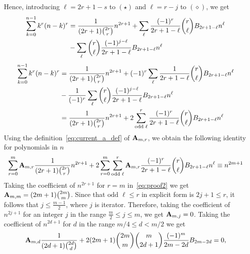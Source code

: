 Hence, introducing $\ell=2r+1-s$ to $(\star)$ and $\ell=r-j$ to $(\diamond)$, we get
\begin{equation*}
    \begin{split}
        \sum_{k=0}^{n-1} k^r (n-k)^r
        &=\frac{1}{(2r+1) \binom{2r}{r}} n^{2r+1}
        +\sum_{\ell} \frac{(-1)^r}{2r+1-\ell} \binom{r}{\ell} {B}\sb{2r+1-\ell} n^{\ell} \\
        &-\sum_{\ell} \binom{r}{\ell} \frac{(-1)^{j-\ell}}{2r+1-\ell} {B}\sb{2r+1-\ell} n^{\ell}
    \end{split}
\end{equation*}
\begin{equation*}
    \begin{split}
        \sum_{k=0}^{n-1} k^r (n-k)^r
        &=\frac{1}{(2r+1) \binom{2r}{r}} n^{2r+1}
        +(-1)^{r} \sum_{\ell} \frac{1}{2r+1-\ell} \binom{r}{\ell} {B}\sb{2r+1-\ell} n^{\ell} \\
        &-\frac{1}{(-1)^{r}} \sum_{\ell} \binom{r}{\ell} \frac{(-1)^{j-\ell}}{2r+1-\ell} {B}\sb{2r+1-\ell} n^{\ell} \\
        &=\frac{1}{(2r+1) \binom{2r}{r}}n^{2r+1}
        +2 \sum_{\text{odd } \ell}^{r} \frac{(-1)^r}{2r+1-\ell} \binom{r}{\ell} {B}\sb{2r+1-\ell} n^{\ell}
    \end{split}
\end{equation*}
Using the definition~\eqref{eq:current_a_def} of ${\mathbf{A}} \sb{m,r}$, we obtain the following identity for polynomials in $n$
\begin{equation}
    \label{eq:proof2}
    \sum_{r=0}^{m} {\mathbf{A}} \sb{m,r} \frac{1}{(2r+1) \binom{2r}{r}} n^{2r+1}
    +2 \sum_{r=0}^{m}\sum_{\text{odd } \ell}^{r} {\mathbf{A}} \sb{m,r} \frac{(-1)^r}{2r+1-\ell}
    \binom{r}{\ell} {B}\sb{2r+1-\ell} n^{\ell}
    \equiv
    n^{2m+1}
\end{equation}
Taking the coefficient of $n^{2r+1}$ for $r=m$ in~\eqref{eq:proof2} we get ${\mathbf{A}} \sb{m,m} = (2m+1) \binom{2m}{m}$.
Since that $\text{odd } \ell \leq r$ in explicit form is $2j + 1 \leq r$, it follows that $j \leq \frac{m-1}{2}$,
where $j$ is iterator.
Therefore, taking the coefficient of $n^{2j+1}$ for an integer $j$ in the range $\frac{m}{2} \leq j \leq m$,
we get ${\mathbf{A}} \sb{m,j} = 0$.
Taking the coefficient of $n^{2d+1}$ for $d$ in the range $m/4 \leq d < m/2$ we get
\begin{equation*}
    {\mathbf{A}} \sb{m,d} \frac{1}{(2d+1) \binom{2d}{d}}
    +2 (2m+1) \binom{2m}{m} \binom{m}{2d+1} \frac{(-1)^m}{2m-2d} {B}\sb{2m-2d} = 0,
\end{equation*}
